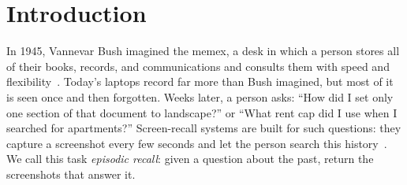 
\section{Introduction}
\label{sec:intro}

In 1945, Vannevar Bush imagined the memex, a desk in which a person stores
all of their books, records, and communications and consults them with speed
and flexibility~\cite{bush1945memex}. Today's laptops record far more than
Bush imagined, but most of it is seen once and then forgotten. Weeks later,
a person asks: ``How did I set only one section of that document to
landscape?'' or ``What rent cap did I use when I searched for apartments?''
Screen-recall systems are built for such questions: they capture a
screenshot every few seconds and let the person search this
history~\cite{hu2020screentrack}. We call this task \emph{episodic recall}:
given a question about the past, return the screenshots that answer it.

